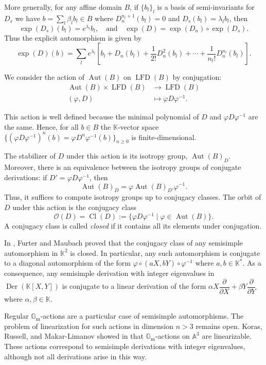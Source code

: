 \documentclass[11pt,a4paper,reqno]{amsart}
\newcommand{\GM}[0]{\ensuremath{\mathbb{G}_{\mathrm{m}}}}
\begin{document}
More generally, for any affine domain $B$, if $\{b_l\}_l$ is a basis of semi-invariants for $D_s$ we have $b = \sum_l \beta_l b_l \in B$ where $D_n^{n_l+1}(b_l) = 0$ and $D_s(b_l) = \lambda_l b_l$, then
\[
\exp(D_s)(b_l) = e^{\lambda_l} b_l, \quad \text{and} \quad \exp(D) = \exp(D_n) \circ \exp(D_s).
\]
Thus the explicit automorphism is given by
\[
\exp(D)(b) = \sum_l e^{\lambda_l} \left[b_l + D_n(b_l) + \frac{1}{2!} D_n^2(b_l) + \cdots + \frac{1}{n_l!} D_n^{n_l}(b_l)\right].
\]

We consider the action of $\operatorname{Aut}(B)$ on $\operatorname{LFD}(B)$ by conjugation:
\[
\begin{aligned}
    \operatorname{Aut}(B)\times \operatorname{LFD}(B)&\longrightarrow \operatorname{LFD}(B) \\
    (\varphi,D) &\mapsto \varphi D \varphi^{-1}.
\end{aligned}
\]

This action is well defined because the minimal polynomial of $D$ and $\varphi D \varphi^{-1}$ are the same. Hence, for all $b\in B$ the $\mathbb{K}$-vector space $\{(\varphi D \varphi^{-1})^n(b) = \varphi D^n \varphi^{-1}(b)\}_{n \geq 0}$ is finite-dimensional.

The stabilizer of $D$ under this action is its isotropy group, $\operatorname{Aut}(B)_D$. Moreover, there is an equivalence between the isotropy groups of conjugate derivations: if $D' = \varphi D \varphi^{-1}$, then
\[
\operatorname{Aut}(B)_D = \varphi \operatorname{Aut}(B)_{D'} \varphi^{-1}.
\]
Thus, it suffices to compute isotropy groups up to conjugacy classes. The orbit of $D$ under this action is the conjugacy class
\[
\mathcal{O}(D) = \operatorname{Cl}(D) := \{\varphi D \varphi^{-1} \mid \varphi \in \operatorname{Aut}(B)\}.
\]
A conjugacy class is called \emph{closed} if it contains all its elements under conjugation.

In \cite{FurMa2010}, Furter and Maubach proved that the conjugacy class of any semisimple automorphism in $\mathbb{K}^2$ is closed. In particular, any such automorphism is conjugate to a diagonal automorphism of the form $\varphi \circ (aX, bY) \circ \varphi^{-1}$  where $a,b\in \mathbb{K}^{\ast}$. As a consequence, any semisimple derivation with integer eigenvalues in $\operatorname{Der}(\mathbb{K}[X,Y])$ is conjugate to a linear derivation of the form $\alpha X \dfrac{\partial}{\partial X} + \beta Y \dfrac{\partial}{\partial Y}$ where $\alpha, \beta\in \mathbb{K}$.

Regular $\GM$-actions are a particular case of semisimple automorphisms. The problem of linearization for such actions in dimension $n > 3$ remains open. Koras, Russell, and Makar-Limanov showed in \cite{KaKoLiRu} that $\GM$-actions on $\mathbb{A}^3$ are linearizable. These actions correspond to semisimple derivations with integer eigenvalues, although not all derivations arise in this way.
\end{document}
